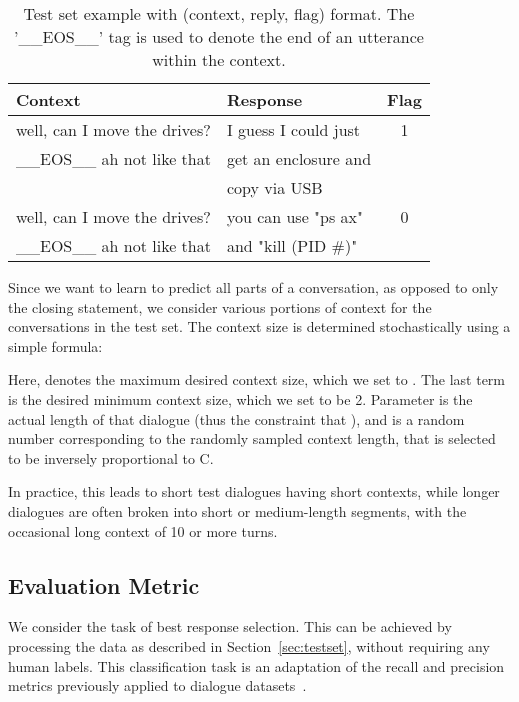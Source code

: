 \documentclass[11pt,a4paper]{article}
\begin{document}
\begin{table}[!ht]
\scriptsize
\begin{tabular}{|l |l |c|} \hline
Context & Response & Flag \\ \hline
well, can I move the drives? & I guess I could just  & 1 \\ \_\_EOS\_\_ ah not like that & get an enclosure and  & \\ 
& copy via USB & \\ \hline
well, can I move the drives? & you can use "ps ax"  & 0 \\ \_\_EOS\_\_ ah not like that & and "kill (PID \#)"  & \\ \hline
\end{tabular}
\caption{\label{table:triple1}Test set example with (context, reply, flag) format. The '\_\_EOS\_\_' tag is used to denote the end of an utterance within the context.} 
\end{table}


Since we want to learn to predict all parts of a conversation, as opposed to only the closing statement, we consider various portions of context for the conversations in the test set. The context size is determined stochastically using a simple formula:
 
Here,  denotes the maximum desired context size, which we set to . The last term is the desired minimum context size, which we set to be 2. Parameter  is the actual length of that dialogue (thus the constraint that ), and  is a random number corresponding to the randomly sampled context length, that is selected to be inversely proportional to C.

In practice, this leads to short test dialogues having short contexts, while longer dialogues are often broken into short or medium-length segments, with the occasional long context of 10 or more turns.





\subsection{Evaluation Metric}

We consider the task of best response selection.   This can be achieved by processing the data as described in Section~\ref{sec:testset}, without requiring any human labels.     This classification task is an adaptation of the recall and precision metrics previously applied to dialogue datasets~\cite{schatzmann2005quantitative}.
\end{document}
